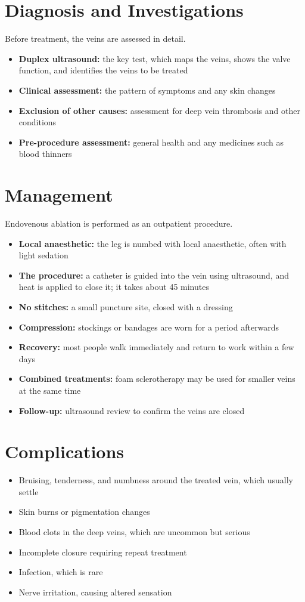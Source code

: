 \section*{Diagnosis and Investigations}
Before treatment, the veins are assessed in detail.
\begin{itemize}
    \item \textbf{Duplex ultrasound:} the key test, which maps the veins, shows the valve function, and identifies the veins to be treated
    \item \textbf{Clinical assessment:} the pattern of symptoms and any skin changes
    \item \textbf{Exclusion of other causes:} assessment for deep vein thrombosis and other conditions
    \item \textbf{Pre-procedure assessment:} general health and any medicines such as blood thinners
\end{itemize}

\section*{Management}
Endovenous ablation is performed as an outpatient procedure.
\begin{itemize}
    \item \textbf{Local anaesthetic:} the leg is numbed with local anaesthetic, often with light sedation
    \item \textbf{The procedure:} a catheter is guided into the vein using ultrasound, and heat is applied to close it; it takes about 45 minutes
    \item \textbf{No stitches:} a small puncture site, closed with a dressing
    \item \textbf{Compression:} stockings or bandages are worn for a period afterwards
    \item \textbf{Recovery:} most people walk immediately and return to work within a few days
    \item \textbf{Combined treatments:} foam sclerotherapy may be used for smaller veins at the same time
    \item \textbf{Follow-up:} ultrasound review to confirm the veins are closed
\end{itemize}

\section*{Complications}
\begin{itemize}
    \item Bruising, tenderness, and numbness around the treated vein, which usually settle
    \item Skin burns or pigmentation changes
    \item Blood clots in the deep veins, which are uncommon but serious
    \item Incomplete closure requiring repeat treatment
    \item Infection, which is rare
    \item Nerve irritation, causing altered sensation
\end{itemize}

